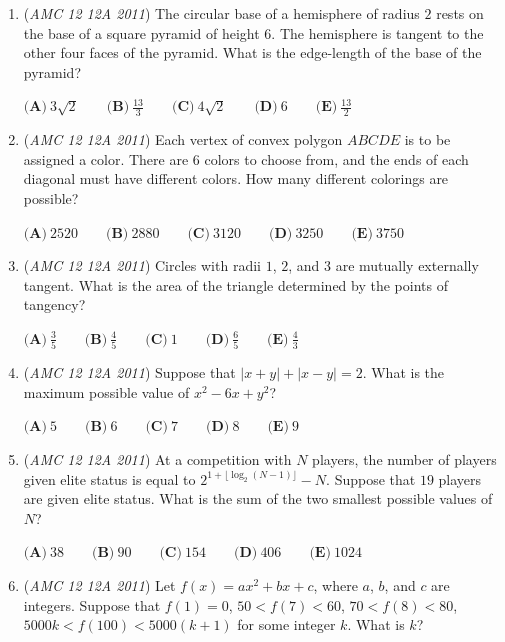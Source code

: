 \begin{enumerate}
 $\textbf{(A)}\ \frac{11}{81} \qquad \textbf{(B)}\ \frac{13}{81} \qquad \textbf{(C)}\ \frac{5}{27} \qquad \textbf{(D)}\ \frac{17}{81} \qquad \textbf{(E)}\ \frac{19}{81}$


	\item (\textit{AMC 12 12A 2011}) The circular base of a hemisphere of radius $2$ rests on the base of a square pyramid of height $6$. The hemisphere is tangent to the other four faces of the pyramid. What is the edge-length of the base of the pyramid?


 $\textbf{(A)}\ 3\sqrt{2} \qquad \textbf{(B)}\ \frac{13}{3} \qquad \textbf{(C)}\ 4\sqrt{2} \qquad \textbf{(D)}\ 6 \qquad \textbf{(E)}\ \frac{13}{2}$


	\item (\textit{AMC 12 12A 2011}) Each vertex of convex polygon $ABCDE$ is to be assigned a color. There are $6$ colors to choose from, and the ends of each diagonal must have different colors. How many different colorings are possible?


 $\textbf{(A)}\ 2520 \qquad \textbf{(B)}\ 2880 \qquad \textbf{(C)}\ 3120 \qquad \textbf{(D)}\ 3250 \qquad \textbf{(E)}\ 3750$


	\item (\textit{AMC 12 12A 2011}) Circles with radii $1$, $2$, and $3$ are mutually externally tangent. What is the area of the triangle determined by the points of tangency?


 $\textbf{(A)}\ \frac{3}{5} \qquad \textbf{(B)}\ \frac{4}{5} \qquad \textbf{(C)}\ 1 \qquad \textbf{(D)}\ \frac{6}{5} \qquad \textbf{(E)}\ \frac{4}{3}$


	\item (\textit{AMC 12 12A 2011}) Suppose that $\left|x+y\right|+\left|x-y\right|=2$. What is the maximum possible value of $x^2-6x+y^2$?


 $\textbf{(A)}\ 5 \qquad \textbf{(B)}\ 6 \qquad \textbf{(C)}\ 7 \qquad \textbf{(D)}\ 8 \qquad \textbf{(E)}\ 9$


	\item (\textit{AMC 12 12A 2011}) At a competition with $N$ players, the number of players given elite status is equal to $2^{1+\lfloor \log_{2} (N-1) \rfloor}-N$. Suppose that $19$ players are given elite status. What is the sum of the two smallest possible values of $N$?


 $\textbf{(A)}\ 38 \qquad \textbf{(B)}\ 90 \qquad \textbf{(C)}\ 154 \qquad \textbf{(D)}\ 406 \qquad \textbf{(E)}\ 1024$


	\item (\textit{AMC 12 12A 2011}) Let $f(x)=ax^2+bx+c$, where $a$, $b$, and $c$ are integers. Suppose that $f(1)=0$, $50<f(7)<60$, $70<f(8)<80$, $5000k<f(100)<5000(k+1)$ for some integer $k$. What is $k$?



\end{enumerate}
